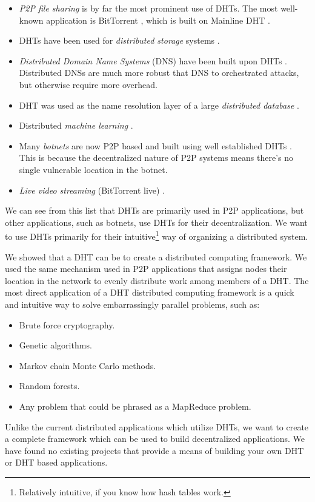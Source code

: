 \begin{itemize}
	\item \textit{P2P file sharing} is by far the most prominent use of DHTs.  
	The most well-known application is BitTorrent \cite{bittorrent}, which is built on Mainline DHT \cite{mainline}.
	\item DHTs have been used for \textit{distributed storage} systems \cite{CFS}.
	\item \textit{Distributed Domain Name Systems} (DNS) have been built upon DHTs \cite{cox2002serving} \cite{pappas2006comparative}.
	Distributed DNSs are much more robust that DNS to orchestrated attacks, but otherwise require more overhead.
	\item DHT was used as the name resolution layer of a large \textit{distributed database} \cite{Mateescu2011440}.
	\item Distributed \textit{machine learning} \cite{liparameter}.
	\item Many \textit{botnets} are now P2P based and built using well established DHTs \cite{saad2011detecting}. 
	This is because the decentralized nature of P2P systems means there's no single vulnerable location in the botnet.
	\item \textit{Live video streaming} (BitTorrent live) \cite{mol2009design}.
\end{itemize}

We can see from this list that DHTs are primarily used in P2P applications, but other applications, such as botnets, use DHTs for their decentralization.
We want to use DHTs primarily for their intuitive\footnote{Relatively intuitive, if you know how hash tables work.} way of organizing a distributed system.

We showed  \cite{chordreduce} that a DHT can be to create a distributed computing framework.
We used the same mechanism used in P2P applications that assigns nodes their location in the network to evenly distribute work among members of a DHT.
The most direct application of a DHT distributed computing framework is  a quick and intuitive way to solve embarrassingly parallel problems, such as:
\begin{itemize}
	\item Brute force cryptography.
	\item Genetic algorithms.
	\item Markov chain Monte Carlo methods.
	\item Random forests.
	\item Any problem that could be phrased as a MapReduce problem.
	
\end{itemize}
Unlike the current distributed applications which utilize DHTs, we want to create a complete framework which can be used to build decentralized applications.
We have found no existing projects that provide a means of building your own DHT or DHT based applications. %


